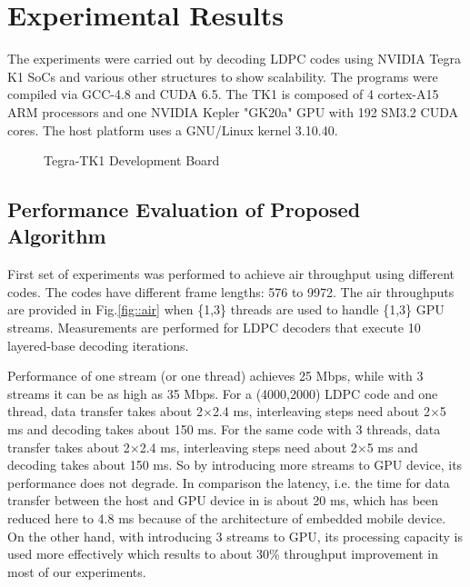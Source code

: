 \documentclass[10pt,a4paper]{article}
\begin{document}
\section{Experimental Results} \label{sec4}

The experiments were carried out by decoding LDPC codes using NVIDIA Tegra K1 SoCs and various other structures to show scalability. The programs were compiled via GCC-4.8 and CUDA 6.5. The TK1 is composed of 4 cortex-A15 ARM processors and one NVIDIA Kepler "GK20a" GPU with 192 SM3.2 CUDA cores. The host platform uses a GNU/Linux kernel 3.10.40.

\begin{figure}[H]
\begin{centering}
\caption[width=.3\textwidth]{Tegra-TK1 Development Board}
\label{tegra}
\end{centering}
\end{figure}

\subsection{Performance Evaluation of Proposed Algorithm} 
First set of experiments was performed to achieve air throughput using different codes. The codes have different frame lengths: 576 to 9972. The air throughputs are provided in Fig.\ref{fig::air} when \{1,3\} threads are used to handle \{1,3\} GPU streams. Measurements are performed for LDPC decoders that execute 10 layered-base decoding iterations.

Performance of one stream (or one thread) achieves 25 Mbps, while with 3 streams it can be as high as 35 Mbps. For a (4000,2000) LDPC code and one thread, data transfer takes about 2$\times$2.4 ms, interleaving steps need about 2$\times$5 ms and decoding takes about 150 ms. For the same code with 3 threads, data transfer takes about 2$\times$2.4 ms, interleaving steps need about 2$\times$5 ms and decoding takes about 150 ms. So by introducing more streams to GPU device, its performance does not degrade. In comparison the latency, i.e. the time for data transfer between the host and GPU device in \cite{art_gpu_0} is about 20 ms, which has been reduced here to 4.8 ms because of the architecture of embedded mobile device. On the other hand, with introducing 3 streams to GPU, its processing capacity is used more effectively which results to about 30\% throughput improvement in most of our experiments.
\end{document}
